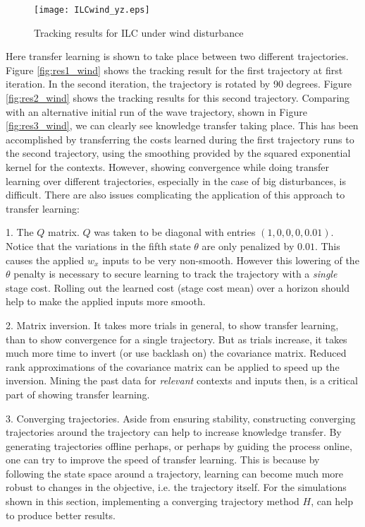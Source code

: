 \begin{figure}
\center	
\texttt{[image: ILCwind\_yz.eps]}	
\caption{Tracking results for ILC under wind disturbance}
\label{fig:ilc_x2}
\end{figure}

Here transfer learning is shown to take place between two different trajectories. Figure \ref{fig:res1_wind} shows the tracking result for the first trajectory at first iteration. In the second iteration, the trajectory is rotated by 90 degrees. Figure \ref{fig:res2_wind} shows the tracking results for this second trajectory. Comparing with an alternative initial run of the wave trajectory, shown in Figure \ref{fig:res3_wind}, we can clearly see knowledge transfer taking place. This has been accomplished by transferring the costs learned during the first trajectory runs to the second trajectory, using the smoothing provided by the squared exponential kernel for the contexts. However, showing convergence while doing transfer learning over different trajectories, especially in the case of big disturbances, is difficult. There are also issues complicating the application of this approach to transfer learning:

1. The $Q$ matrix. $Q$ was taken to be diagonal with entries $(1,0,0,0,0.01)$. Notice that the variations in the fifth state $\theta$ are only penalized by $0.01$. This causes the applied $w_{x}$ inputs to be very non-smooth. However this lowering of the $\theta$ penalty is necessary to secure learning to track the trajectory with a \emph{single} stage cost. Rolling out the learned cost (stage cost mean) over a horizon should help to make the applied inputs more smooth.

2. Matrix inversion. It takes more trials in general, to show transfer learning, than to show convergence for a single trajectory. But as trials increase, it takes much more time to invert (or use backlash on) the covariance matrix. Reduced rank approximations of the covariance matrix can be applied to speed up the inversion. Mining the past data for \emph{relevant} contexts and inputs then, is a critical part of showing transfer learning.

3. Converging trajectories. Aside from ensuring stability, constructing converging trajectories around the trajectory can help to increase knowledge transfer. By generating trajectories offline perhaps, or perhaps by guiding the process online, one can try to improve the speed of transfer learning. This is because by following the state space around a trajectory, learning can become much more robust to changes in the objective, i.e. the trajectory itself. For the simulations shown in this section, implementing a converging trajectory method $H$, can help to produce better results.

